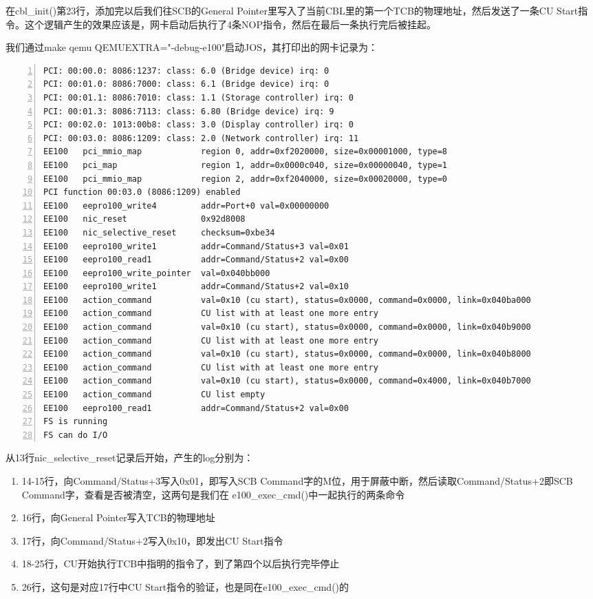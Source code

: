 \documentclass{article}
\newcommand{\funcname}[1]{{\ttfamily \small #1}}
\begin{document}
\begin{CJK*}{UTF8}{gkai}
在\funcname{cbl\_init()}第23行，添加完以后我们往SCB的General Pointer里写入了当前CBL里的第一个TCB的物理地址，然后发送了一条CU Start指令。这个逻辑产生的效果应该是，网卡启动后执行了4条NOP指令，然后在最后一条执行完后被挂起。

我们通过make qemu QEMUEXTRA="-debug-e100"启动JOS，其打印出的网卡记录为：

\begin{lstlisting}[style=console, numbers=left, basicstyle=\tiny\color{green}\ttfamily\bfseries]
PCI: 00:00.0: 8086:1237: class: 6.0 (Bridge device) irq: 0
PCI: 00:01.0: 8086:7000: class: 6.1 (Bridge device) irq: 0
PCI: 00:01.1: 8086:7010: class: 1.1 (Storage controller) irq: 0
PCI: 00:01.3: 8086:7113: class: 6.80 (Bridge device) irq: 9
PCI: 00:02.0: 1013:00b8: class: 3.0 (Display controller) irq: 0
PCI: 00:03.0: 8086:1209: class: 2.0 (Network controller) irq: 11
EE100	pci_mmio_map            region 0, addr=0xf2020000, size=0x00001000, type=8
EE100	pci_map                 region 1, addr=0x0000c040, size=0x00000040, type=1
EE100	pci_mmio_map            region 2, addr=0xf2040000, size=0x00020000, type=0
PCI function 00:03.0 (8086:1209) enabled
EE100	eepro100_write4         addr=Port+0 val=0x00000000
EE100	nic_reset               0x92d8008
EE100	nic_selective_reset     checksum=0xbe34
EE100	eepro100_write1         addr=Command/Status+3 val=0x01
EE100	eepro100_read1          addr=Command/Status+2 val=0x00
EE100	eepro100_write_pointer  val=0x040bb000
EE100	eepro100_write1         addr=Command/Status+2 val=0x10
EE100	action_command          val=0x10 (cu start), status=0x0000, command=0x0000, link=0x040ba000
EE100	action_command          CU list with at least one more entry
EE100	action_command          val=0x10 (cu start), status=0x0000, command=0x0000, link=0x040b9000
EE100	action_command          CU list with at least one more entry
EE100	action_command          val=0x10 (cu start), status=0x0000, command=0x0000, link=0x040b8000
EE100	action_command          CU list with at least one more entry
EE100	action_command          val=0x10 (cu start), status=0x0000, command=0x4000, link=0x040b7000
EE100	action_command          CU list empty
EE100	eepro100_read1          addr=Command/Status+2 val=0x00
FS is running
FS can do I/O
\end{lstlisting}

从13行nic\_selective\_reset记录后开始，产生的log分别为：

\begin{enumerate}
\item{14-15行，向Command/Status+3写入0x01，即写入SCB Command字的M位，用于屏蔽中断，然后读取Command/Status+2即SCB Command字，查看是否被清空，这两句是我们在 \funcname{e100\_exec\_cmd()}中一起执行的两条命令}
\item{16行，向General Pointer写入TCB的物理地址}
\item{17行，向Command/Status+2写入0x10，即发出CU Start指令}
\item{18-25行，CU开始执行TCB中指明的指令了，到了第四个以后执行完毕停止}
\item{26行，这句是对应17行中CU Start指令的验证，也是同在\funcname{e100\_exec\_cmd()}的}
\end{enumerate}


\end{CJK*}
\end{document}
